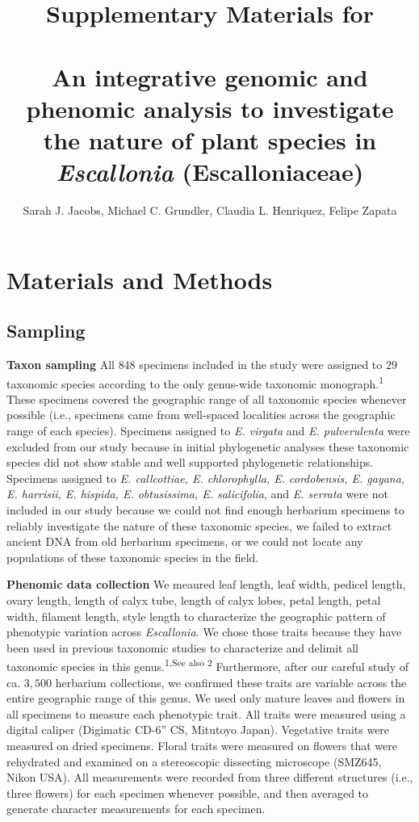 \documentclass[
  11pt,
]{article}
\title{Supplementary Materials for\\
~\\
\textbf{An integrative genomic and phenomic analysis to investigate the nature of plant species in \emph{Escallonia} (Escalloniaceae)}}
\author{Sarah J. Jacobs, Michael C. Grundler, Claudia L. Henriquez, Felipe Zapata}
\date{}
\begin{document}
\maketitle

{
\hypersetup{linkcolor=}
\setcounter{tocdepth}{4}
\tableofcontents
}
\hypertarget{materials-and-methods}{%
\section{Materials and Methods}\label{materials-and-methods}}

\hypertarget{sampling}{%
\subsection{Sampling}\label{sampling}}

\textbf{Taxon sampling} All \(848\) specimens included in the study were assigned to \(29\) taxonomic species according to the only genus-wide taxonomic monograph.\textsuperscript{1} These specimens covered the geographic range of all taxonomic species whenever possible (i.e., specimens came from well-spaced localities across the geographic range of each species). Specimens assigned to \emph{E. virgata} and \emph{E. pulverulenta} were excluded from our study because in initial phylogenetic analyses these taxonomic species did not show stable and well supported phylogenetic relationships. Specimens assigned to \emph{E. callcottiae, E. chlorophylla, E. cordobensis, E. gayana, E. harrisii, E. hispida, E. obtusissima, E. salicifolia}, and \emph{E. serrata} were not included in our study because we could not find enough herbarium specimens to reliably investigate the nature of these taxonomic species, we failed to extract ancient DNA from old herbarium specimens, or we could not locate any populations of these taxonomic species in the field.

\textbf{Phenomic data collection} We meaured leaf length, leaf width, pedicel length, ovary length, length of calyx tube, length of calyx lobes, petal length, petal width, filament length, style length to characterize the geographic pattern of phenotypic variation across \emph{Escallonia}. We chose those traits because they have been used in previous taxonomic studies to characterize and delimit all taxonomic species in this genus.\textsuperscript{1,See also 2} Furthermore, after our careful study of ca. \(3,500\) herbarium collections, we confirmed these traits are variable across the entire geographic range of this genus. We used only mature leaves and flowers in all specimens to measure each phenotypic trait. All traits were measured using a digital caliper (Digimatic CD-6'' CS, Mitutoyo Japan). Vegetative traits were measured on dried specimens. Floral traits were measured on flowers that were rehydrated and examined on a stereoscopic dissecting microscope (SMZ645, Nikon USA). All measurements were recorded from three different structures (i.e., three flowers) for each specimen whenever possible, and then averaged to generate character measurements for each specimen.
\end{document}

